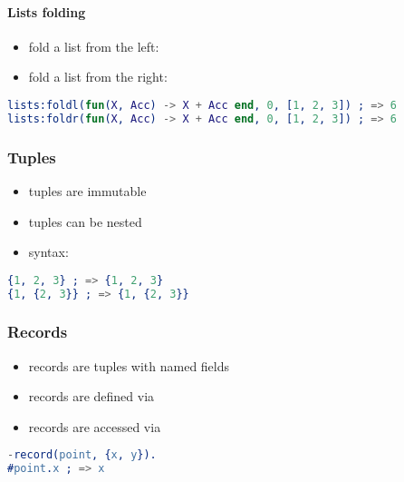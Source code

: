 \documentclass[a4paper,landscape,10pt]{article}
\begin{document}
\begin{multicols*}{2}
  \paragraph{Lists folding}

  \begin{itemize}
    \item fold a list from the left: 
    \item fold a list from the right: 
  \end{itemize}

  \begin{lstlisting}[language=Erlang]
lists:foldl(fun(X, Acc) -> X + Acc end, 0, [1, 2, 3]) ; => 6
lists:foldr(fun(X, Acc) -> X + Acc end, 0, [1, 2, 3]) ; => 6
\end{lstlisting}

  \subsubsection{Tuples}

  \begin{itemize}
    \item tuples are immutable
    \item tuples can be nested
    \item syntax: 
  \end{itemize}

  \begin{lstlisting}[language=Erlang]
{1, 2, 3} ; => {1, 2, 3}
{1, {2, 3}} ; => {1, {2, 3}}
\end{lstlisting}

  \breakcolumn

  \subsubsection{Records}

  \begin{itemize}
    \item records are tuples with named fields
    \item records are defined via 
    \item records are accessed via 
  \end{itemize}

  \begin{lstlisting}[language=Erlang]
-record(point, {x, y}).
#point.x ; => x
\end{lstlisting}


\end{multicols*}
\end{document}
